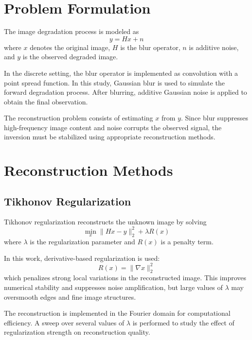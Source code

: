 \documentclass[conference]{IEEEtran}
\begin{document}
	\section{Problem Formulation}
	The image degradation process is modeled as
	\begin{equation}
		y = Hx + n
	\end{equation}
	where $x$ denotes the original image, $H$ is the blur operator, $n$ is additive noise, and $y$ is the observed degraded image.
	
	In the discrete setting, the blur operator is implemented as convolution with a point spread function. In this study, Gaussian blur is used to simulate the forward degradation process. After blurring, additive Gaussian noise is applied to obtain the final observation.
	
	The reconstruction problem consists of estimating $x$ from $y$. Since blur suppresses high-frequency image content and noise corrupts the observed signal, the inversion must be stabilized using appropriate reconstruction methods.
	
	\section{Reconstruction Methods}
	
	\subsection{Tikhonov Regularization}
	Tikhonov regularization reconstructs the unknown image by solving
	\begin{equation}
		\min_x \|Hx-y\|_2^2 + \lambda R(x)
	\end{equation}
	where $\lambda$ is the regularization parameter and $R(x)$ is a penalty term.
	
	In this work, derivative-based regularization is used:
	\begin{equation}
		R(x) = \|\nabla x\|_2^2
	\end{equation}
	which penalizes strong local variations in the reconstructed image. This improves numerical stability and suppresses noise amplification, but large values of $\lambda$ may oversmooth edges and fine image structures.
	
	The reconstruction is implemented in the Fourier domain for computational efficiency. A sweep over several values of $\lambda$ is performed to study the effect of regularization strength on reconstruction quality.
	
\end{document}
